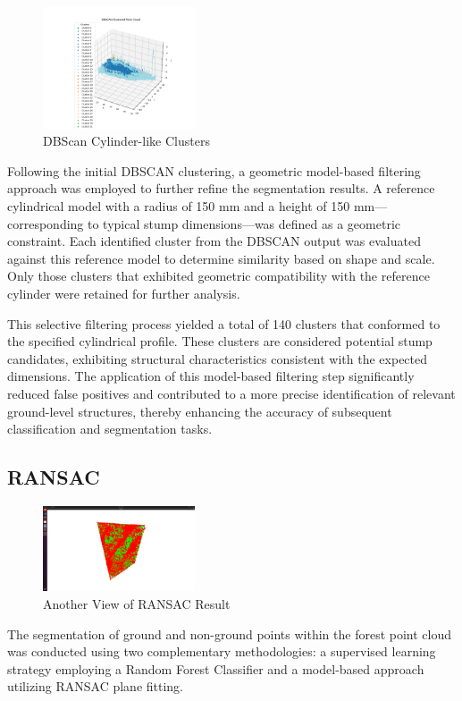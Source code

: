 \documentclass[../report.tex]{subfiles}
\begin{document}
    \begin{figure}[H]
        \centering
        \includegraphics[width=0.4\textwidth]{rnd-project-report-main/figures/Clustering_2_filtered_point_cloud_with labels.png}
        \caption{DBScan Cylinder-like Clusters}
    \end{figure}
    Following the initial DBSCAN clustering, a geometric model-based filtering approach was employed to further refine the segmentation results. A reference cylindrical model with a radius of 150 mm and a height of 150 mm—corresponding to typical stump dimensions—was defined as a geometric constraint. Each identified cluster from the DBSCAN output was evaluated against this reference model to determine similarity based on shape and scale. Only those clusters that exhibited geometric compatibility with the reference cylinder were retained for further analysis.

    This selective filtering process yielded a total of 140 clusters that conformed to the specified cylindrical profile. These clusters are considered potential stump candidates, exhibiting structural characteristics consistent with the expected dimensions. The application of this model-based filtering step significantly reduced false positives and contributed to a more precise identification of relevant ground-level structures, thereby enhancing the accuracy of subsequent classification and segmentation tasks.

    \subsection{RANSAC}
    \begin{figure}[H]
        \centering
        \includegraphics[width=0.4\textwidth]{rnd-project-report-main/figures/RANSAC.png}
        \caption{Another View of RANSAC Result}
    \end{figure}
    The segmentation of ground and non-ground points within the forest point cloud was conducted using two complementary methodologies: a supervised learning strategy employing a Random Forest Classifier and a model-based approach utilizing RANSAC plane fitting.
    
\end{document}
